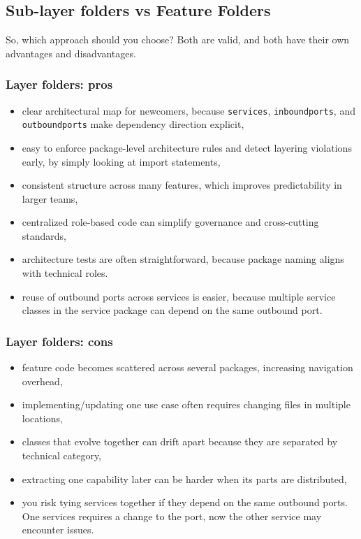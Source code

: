 \subsection{Sub-layer folders vs Feature Folders}
\label{sec:hexagonal_layers_vs_features}

So, which approach should you choose? Both are valid, and both have their own advantages and disadvantages.

\subsubsection{Layer folders: pros}

\begin{itemize}
    \item clear architectural map for newcomers, because \texttt{services}, \texttt{inboundports}, and \texttt{outboundports} make dependency direction explicit,
    \item easy to enforce package-level architecture rules and detect layering violations early, by simply looking at import statements,
    \item consistent structure across many features, which improves predictability in larger teams,
    \item centralized role-based code can simplify governance and cross-cutting standards,
    \item architecture tests are often straightforward, because package naming aligns with technical roles.
    \item reuse of outbound ports across services is easier, because multiple service classes in the service package can depend on the same outbound port.
\end{itemize}

\subsubsection{Layer folders: cons}

\begin{itemize}
    \item feature code becomes scattered across several packages, increasing navigation overhead,
    \item implementing/updating one use case often requires changing files in multiple locations,
    \item classes that evolve together can drift apart because they are separated by technical category,
    \item extracting one capability later can be harder when its parts are distributed,
    \item you risk tying services together if they depend on the same outbound ports. One services requires a change to the port, now the other service may encounter issues.
\end{itemize}

